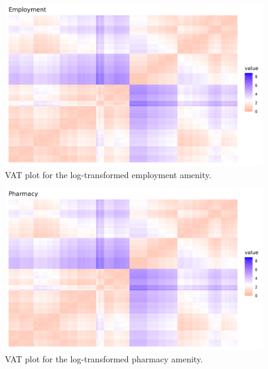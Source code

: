 \documentclass[11pt, a4paper]{article}
\begin{document}
\begin{figure}[H]
\centering
\includegraphics[width=\textwidth]{./vat/emp_vat_log.png}
\caption[Employment VAT plot]{VAT plot for the log-transformed employment amenity.}\label{empvat}
\end{figure}








\begin{figure}[H]
\centering
\includegraphics[width=\textwidth]{./vat/pharma_vat_log.png}
\caption[Pharmacy VAT plot]{VAT plot for the log-transformed pharmacy amenity.}\label{pharmavat}
\end{figure}
\end{document}
